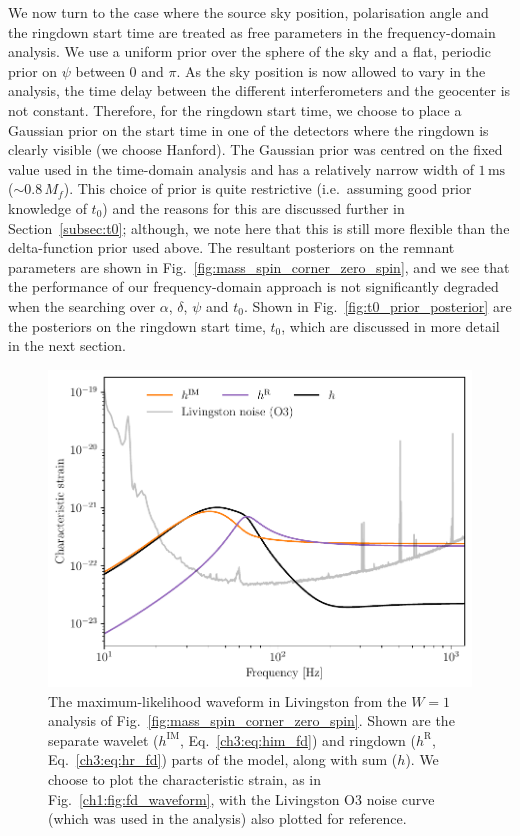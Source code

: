 We now turn to the case where the source sky position, polarisation angle and the ringdown start time are treated as free parameters in the frequency-domain analysis.
We use a uniform prior over the sphere of the sky and a flat, periodic prior on $\psi$ between $0$ and $\pi$.
As the sky position is now allowed to vary in the analysis, the time delay between the different interferometers and the geocenter is not constant. 
Therefore, for the ringdown start time, we choose to place a Gaussian prior on the start time in one of the detectors where the ringdown is clearly visible (we choose Hanford). 
The Gaussian prior was centred on the fixed value used in the time-domain analysis and has a relatively narrow width of $1\,\mathrm{ms}$ ($\sim 0.8\,M_f$).
This choice of prior is quite restrictive (i.e.\ assuming good prior knowledge of $t_0$) and the reasons for this are discussed further in Section~\ref{subsec:t0}; although, we note here that this is still more flexible than the delta-function prior used above.
The resultant posteriors on the remnant parameters are shown in Fig.~\ref{fig:mass_spin_corner_zero_spin}, and we see that the performance of our frequency-domain approach is not significantly degraded when the searching over $\alpha$, $\delta$, $\psi$ and $t_0$.
Shown in Fig.~\ref{fig:t0_prior_posterior} are the posteriors on the ringdown start time, $t_0$, which are discussed in more detail in the next section.

\begin{figure}[t]
    \centering
    \includegraphics[width=0.6\columnwidth]{Figures/FrequencyDomainAnalysisofBlackHoleRingdowns/fd_wfs.pdf}
    \caption[Maximum-likelihood frequency-domain waveform from the analysis of Fig.~\ref{fig:mass_spin_corner_zero_spin}]{
    The maximum-likelihood waveform in Livingston from the $W=1$ analysis of Fig.~\ref{fig:mass_spin_corner_zero_spin}. 
    Shown are the separate wavelet ($h^\mathrm{IM}$, Eq.~\ref{ch3:eq:him_fd}) and ringdown ($h^\mathrm{R}$, Eq.~\ref{ch3:eq:hr_fd}) parts of the model, along with sum ($h$). 
    We choose to plot the characteristic strain, as in Fig.~\ref{ch1:fig:fd_waveform}, with the Livingston O3 noise curve (which was used in the analysis) also plotted for reference. 
    }
    \label{ch3:fig:fd_wfs}
\end{figure}

